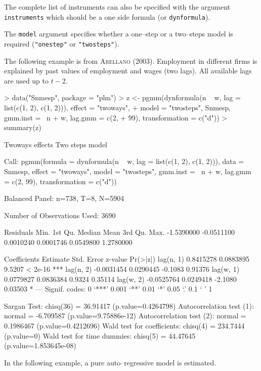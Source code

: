 \documentclass[a4paper]{article}
\begin{document}
The complete list of instruments can also be specified with the
argument \texttt{instruments} which should be a one side formula (or \texttt{dynformula}). 


The \texttt{model} argument specifies whether a one--step or a
two--steps model is required (\texttt{"onestep"} or \texttt{"twosteps"}).

The  following example is from \textsc{Arellano} (2003). Employment in
different firms is explained by past values of employment and wages
(two lags). All available lags are used up to $t-2$.

\begin{Schunk}
\begin{Sinput}
> data("Snmesp", package = "plm")
> z <- pgmm(dynformula(n ~ w, lag = list(c(1, 2), c(1, 2))), effect = "twoways", 
+     model = "twosteps", Snmesp, gmm.inst = ~n + w, lag.gmm = c(2, 
+         99), transformation = c("d"))
> summary(z)
\end{Sinput}
\begin{Soutput}
Twoways effects Two steps model

Call:
pgmm(formula = dynformula(n ~ w, lag = list(c(1, 2), c(1, 2))), 
    data = Snmesp, effect = "twoways", model = "twosteps", gmm.inst = ~n + 
        w, lag.gmm = c(2, 99), transformation = c("d"))

Balanced Panel: n=738, T=8, N=5904

Number of Observations Used:  3690 

Residuals
      Min.    1st Qu.     Median       Mean    3rd Qu.       Max. 
-1.5390000 -0.0511100  0.0010240  0.0001746  0.0549800  1.2780000 

Coefficients
            Estimate Std. Error z-value Pr(>|z|)    
lag(n, 1)  0.8415278  0.0883895  9.5207  < 2e-16 ***
lag(n, 2) -0.0031454  0.0290445 -0.1083  0.91376    
lag(w, 1)  0.0779827  0.0836384  0.9324  0.35114    
lag(w, 2) -0.0525764  0.0249418 -2.1080  0.03503 *  
---
Signif. codes:  0 ‘***’ 0.001 ‘**’ 0.01 ‘*’ 0.05 ‘.’ 0.1 ‘ ’ 1 

Sargan Test: chisq(36) = 36.91417 (p.value=0.4264798)
Autocorrelation test (1): normal = -6.709587 (p.value=9.75886e-12)
Autocorrelation test (2): normal = 0.1986467 (p.value=0.4212696)
Wald test for coefficients: chisq(4) = 234.7444 (p.value=0)
Wald test for time dummies: chisq(5) = 44.47645 (p.value=1.853645e-08)
\end{Soutput}
\end{Schunk}

In the following example, a pure auto--regressive model is
estimated.
\end{document}
